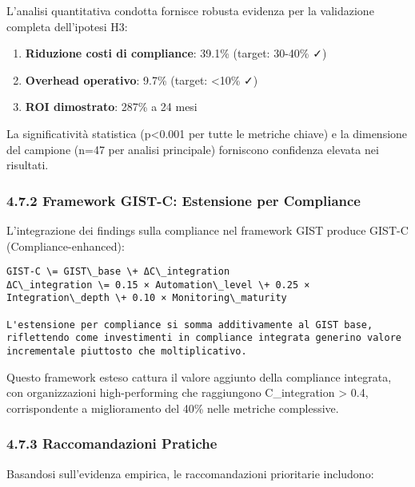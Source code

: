 \documentclass{report}
\begin{document}
L'analisi quantitativa condotta fornisce robusta evidenza per la
validazione completa dell'ipotesi H3:

\begin{enumerate}
\def\labelenumi{\arabic{enumi}.}
\tightlist
\item
  \textbf{Riduzione costi di compliance}: 39.1\% (target: 30-40\% ✓)
\item
  \textbf{Overhead operativo}: 9.7\% (target: \textless10\% ✓)
\item
  \textbf{ROI dimostrato}: 287\% a 24 mesi
\end{enumerate}

La significatività statistica (p\textless0.001 per tutte le metriche
chiave) e la dimensione del campione (n=47 per analisi principale)
forniscono confidenza elevata nei risultati.

\subsubsection{4.7.2 Framework GIST-C: Estensione per
Compliance}\label{framework-gist-c-estensione-per-compliance}

L'integrazione dei findings sulla compliance nel framework GIST produce
GIST-C (Compliance-enhanced):

\begin{verbatim}
GIST-C \= GIST\_base \+ ΔC\_integration  
ΔC\_integration \= 0.15 × Automation\_level \+ 0.25 × Integration\_depth \+ 0.10 × Monitoring\_maturity

L'estensione per compliance si somma additivamente al GIST base, riflettendo come investimenti in compliance integrata generino valore incrementale piuttosto che moltiplicativo.
\end{verbatim}

Questo framework esteso cattura il valore aggiunto della compliance
integrata, con organizzazioni high-performing che raggiungono
C\_integration \textgreater{} 0.4, corrispondente a miglioramento del
40\% nelle metriche complessive.

\subsubsection{4.7.3 Raccomandazioni
Pratiche}\label{raccomandazioni-pratiche}

Basandosi sull'evidenza empirica, le raccomandazioni prioritarie
includono:
\end{document}

